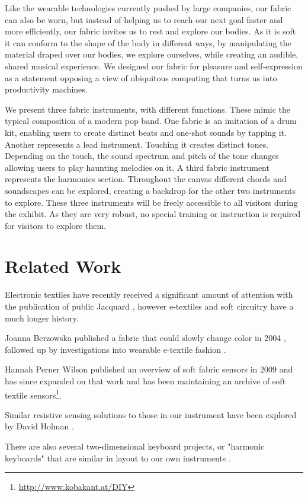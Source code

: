 \documentclass{sigchi-ext}
\begin{document}
Like the wearable technologies currently pushed by large companies, our fabric can also be worn, but instead of helping us to reach our next goal faster and more efficiently, our fabric invites us to rest and explore our bodies. As it is soft it can conform to the shape of the body in different ways, by manipulating the material draped over our bodies, we explore ourselves, while creating an audible, shared musical experience. We designed our fabric for pleasure and self-expression as a statement opposing a view of ubiquitous computing that turns us into productivity machines.

We present three fabric instruments, with different functions. These mimic the typical composition of a modern pop band. One fabric is an imitation of a drum kit, enabling users to create distinct beats and one-shot sounds by tapping it. Another represents a lead instrument. Touching it creates distinct tones. Depending on the touch, the sound spectrum and pitch of the tone changes allowing users to play haunting melodies on it. A third fabric instrument represents the harmonics section. Throughout the canvas different chords and soundscapes can be explored, creating a backdrop for the other two instruments to explore. These three instruments will be freely accessible to all visitors during the exhibit. As they are very robust, no special training or instruction is required for visitors to explore them.


\section{Related Work}
Electronic textiles have recently received a significant amount of attention with the publication of public Jacquard \cite{jacquard}, however e-textiles and soft circuitry have a much longer history.

Joanna Berzowska published a fabric that could slowly change color in 2004 \cite{berzowska:05} , followed up by investigations into wearable e-textile fashion \cite{berzowska:04}.

Hannah Perner Wilson published an overview of soft fabric sensors in 2009 \cite{perner-wilson:09} and has since expanded on that work \cite{perner-wilson:10} and has been maintaining an archive of soft textile sensors\footnote{\url{http://www.kobakant.at/DIY}}.

Similar resistive sensing solutions to those in our instrument have been explored by David Holman \cite{holman:14, holman:11}.

There are also several two-dimensional keyboard projects, or "harmonic keyboards" that are similar in layout to our own instruments \cite{lambdoma, seaboard, linnstrument, omnichord}.
\end{document}
